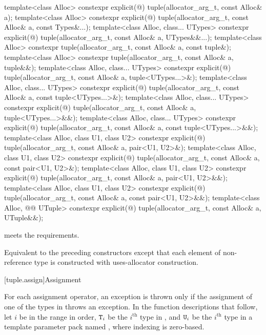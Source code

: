 %
\begin{itemdecl}
template<class Alloc>
  constexpr explicit(@\seebelow@)
    tuple(allocator_arg_t, const Alloc& a);
template<class Alloc>
  constexpr explicit(@\seebelow@)
    tuple(allocator_arg_t, const Alloc& a, const Types&...);
template<class Alloc, class... UTypes>
  constexpr explicit(@\seebelow@)
    tuple(allocator_arg_t, const Alloc& a, UTypes&&...);
template<class Alloc>
  constexpr tuple(allocator_arg_t, const Alloc& a, const tuple&);
template<class Alloc>
  constexpr tuple(allocator_arg_t, const Alloc& a, tuple&&);
template<class Alloc, class... UTypes>
  constexpr explicit(@\seebelow@)
    tuple(allocator_arg_t, const Alloc& a, tuple<UTypes...>&);
template<class Alloc, class... UTypes>
  constexpr explicit(@\seebelow@)
    tuple(allocator_arg_t, const Alloc& a, const tuple<UTypes...>&);
template<class Alloc, class... UTypes>
  constexpr explicit(@\seebelow@)
    tuple(allocator_arg_t, const Alloc& a, tuple<UTypes...>&&);
template<class Alloc, class... UTypes>
  constexpr explicit(@\seebelow@)
    tuple(allocator_arg_t, const Alloc& a, const tuple<UTypes...>&&);
template<class Alloc, class U1, class U2>
  constexpr explicit(@\seebelow@)
    tuple(allocator_arg_t, const Alloc& a, pair<U1, U2>&);
template<class Alloc, class U1, class U2>
  constexpr explicit(@\seebelow@)
    tuple(allocator_arg_t, const Alloc& a, const pair<U1, U2>&);
template<class Alloc, class U1, class U2>
  constexpr explicit(@\seebelow@)
    tuple(allocator_arg_t, const Alloc& a, pair<U1, U2>&&);
template<class Alloc, class U1, class U2>
  constexpr explicit(@\seebelow@)
    tuple(allocator_arg_t, const Alloc& a, const pair<U1, U2>&&);
template<class Alloc, @@ UTuple>
  constexpr explicit(@\seebelow@)
    tuple(allocator_arg_t, const Alloc& a, UTuple&&);
\end{itemdecl}

\begin{itemdescr}
\pnum
\expects
{} meets
the  requirements.

\pnum
\effects
Equivalent to the preceding constructors
except that each element of non-reference type is constructed with
uses-allocator construction.
\end{itemdescr}

[tuple.assign]{Assignment}

\pnum
For each  assignment operator, an exception is thrown only if the
assignment of one of the types in  throws an exception.
In the function descriptions that follow, let $i$ be in the range 
in order, $\tcode{T}_i$ be the $i^\text{th}$ type in ,
and $\tcode{U}_i$ be the $i^\text{th}$ type in a
template parameter pack named , where indexing is zero-based.

